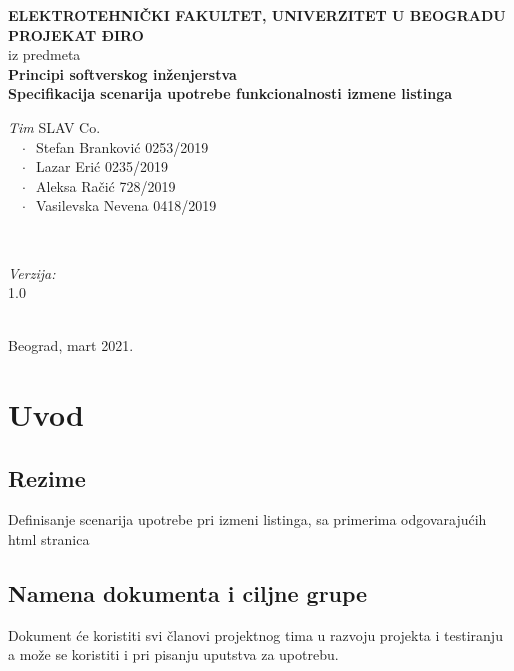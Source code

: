 \documentclass[12pt]{article}
\begin{document}
    \renewcommand{\labelenumii}{\arabic{enumi}.\arabic{enumii}}
	\begin{titlepage}  
		\center
		\textbf{ \LARGE ELEKTROTEHNIČKI FAKULTET, UNIVERZITET U BEOGRADU } \\[4cm]
		\textbf{ \Large PROJEKAT ĐIRO\texttrademark} \\[0.3cm]
		iz predmeta \\[0.3cm]
		\textbf{ \Large Principi softverskog inženjerstva} \\[0.7cm]
		{ \huge \bfseries Specifikacija scenarija upotrebe funkcionalnosti izmene listinga } \\[6cm]
		

		\begin{minipage}{0.5\textwidth}
			\begin{flushleft}
				\large
				\emph{Tim} SLAV Co. \\
			     $\;\;\; \cdot \;\;$Stefan Branković  0253/2019\\
			     $\;\;\; \cdot \;\;$Lazar Erić 0235/2019\\
			     $\;\;\; \cdot \;\;$Aleksa Račić 728/2019\\
			     $\;\;\; \cdot \;\;$Vasilevska Nevena 0418/2019
			\end{flushleft}
		\end{minipage}
		~
		\begin{minipage}{0.4\textwidth}
			\begin{flushright}
				\large
				\emph{Verzija:} \\
				1.0
			\end{flushright}
		\end{minipage} \\[2cm]
		\enlargethispage{4\baselineskip}
		{ \large Beograd, mart 2021. }
		\vfill
	\end{titlepage}
\pagebreak
\tableofcontents
\pagebreak



\section{Uvod}
\subsection{Rezime}
Definisanje scenarija upotrebe pri izmeni listinga, sa primerima odgovarajućih html stranica
\subsection{Namena dokumenta i ciljne grupe}
Dokument će koristiti svi članovi projektnog tima u razvoju projekta i testiranju a može se koristiti i pri pisanju uputstva za
upotrebu.
\end{document}

